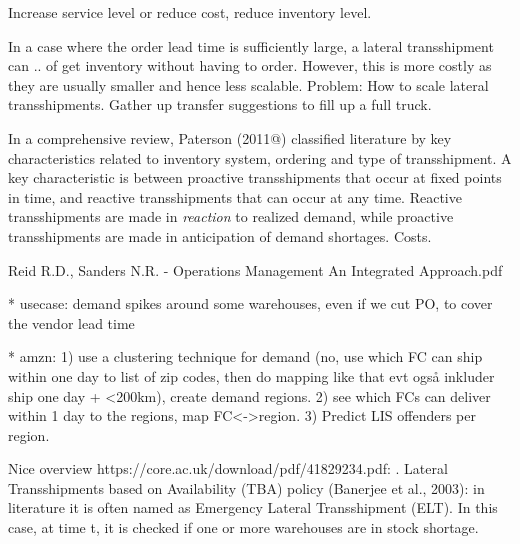 \documentclass[../../main.tex]{subfiles}
\begin{document}
Increase service level or reduce cost, reduce inventory level.



In a case where the order lead time is sufficiently large, a lateral transshipment can .. of get inventory without having to order. However, this is more costly as they are usually smaller and hence less scalable. Problem: How to scale lateral transshipments. Gather up transfer suggestions to fill up a full truck.

In a comprehensive review, Paterson (2011@) classified literature by key characteristics related to inventory system, ordering and type of transshipment. A key characteristic is between proactive transshipments that occur at fixed points in time, and reactive transshipments that can occur at any time. Reactive transshipments are made in \textit{reaction} to realized demand, while proactive transshipments are made in anticipation of demand shortages. Costs.


Reid R.D., Sanders N.R. - Operations Management An Integrated Approach.pdf


* usecase: demand spikes around some warehouses, even if we cut PO, to cover the vendor lead time

* amzn: 1) use a clustering technique for demand (no, use which FC can ship within one day to list of zip codes, then do mapping like that evt også inkluder ship one day + <200km), create demand regions. 2) see which FCs can deliver within 1 day to the regions, map FC<->region. 3) Predict LIS offenders per region. 

Nice overview https://core.ac.uk/download/pdf/41829234.pdf:
. Lateral Transshipments based on Availability (TBA) policy (Banerjee et al., 2003): in literature it is often named as Emergency Lateral Transshipment (ELT). In this case, at time t, it is checked if one or more warehouses are in stock shortage. 



\end{document}
